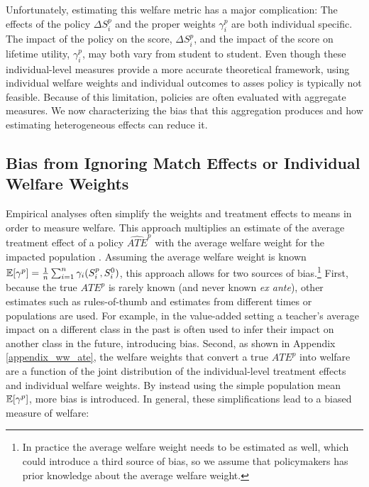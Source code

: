\documentclass[12pt]{article}
\theoremstyle{definition}
\theoremstyle{definition}
\theoremstyle{definition}
\theoremstyle{definition}
\begin{document}


Unfortunately, estimating this welfare metric has a major complication: The effects of the policy $\Delta S^p_i$ and the proper weights $\gamma_i^p$ are both individual specific. The impact of the policy on the score, $\Delta S^p_i$, and the impact of the score on lifetime utility, $\gamma_i^p$, may both vary from student to student. Even though these individual-level measures provide a more accurate theoretical framework, using individual welfare weights and individual outcomes to asses policy is typically not feasible. %
 Because of this limitation, policies are often evaluated with aggregate measures. We now characterizing the bias that this aggregation produces and how estimating heterogeneous effects can reduce it.   

\subsection{Bias from Ignoring Match Effects or Individual Welfare Weights}

Empirical analyses often simplify the weights and treatment effects to means in order to measure welfare. This approach multiplies an estimate of the average treatment effect of a policy $\widehat{ATE}^p$ with the average welfare weight for the impacted population \citep[see intutition in][]{Keyser_2020}. Assuming the average welfare weight is known $\mathbb{E}[\gamma^p] = \frac{1}{n}\sum_{i=1}^n \gamma_i(S_i^p, S_i^0)$, this approach allows for two sources of bias.\footnote{In practice the average welfare weight needs to be estimated as well, which could introduce a third source of bias, so we assume that policymakers has prior knowledge about the average welfare weight.} First, because the true $ATE^p$ is rarely known (and never known \textit{ex ante}), other estimates such as rules-of-thumb and estimates from different times or populations are used. For example, in the value-added setting a teacher's average impact on a different class in the past is often used to infer their impact on another class in the future, introducing bias. Second, as shown in Appendix \ref{appendix_ww_ate}, the welfare weights that convert a true $ATE^p$ into welfare are a function of the joint distribution of the individual-level treatment effects and individual welfare weights. By instead using the simple population mean $\mathbb{E}[\gamma^p]$, more bias is introduced. In general, these simplifications lead to a biased measure of welfare:
\end{document}
